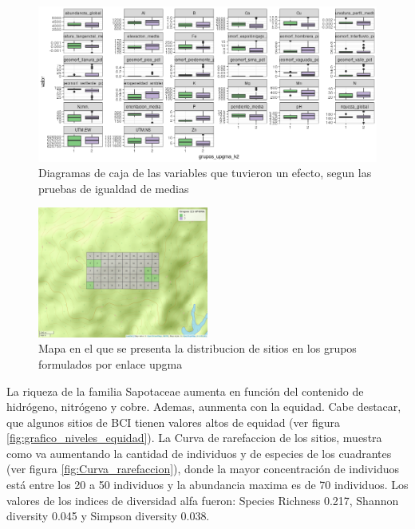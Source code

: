 \documentclass[11pt,]{article}
\begin{document}
\begin{figure}
\centering
\includegraphics[width=1.00000\textwidth]{actualizacion2_grupos_upgma.png}
\caption{Diagramas de caja de las variables que tuvieron un efecto,
segun las pruebas de igualdad de medias\label{fig:grupos_upgma}}
\end{figure}

\begin{figure}
\centering
\includegraphics[width=0.50000\textwidth]{mapa_upgma_k2.png}
\caption{Mapa en el que se presenta la distribucion de sitios en los
grupos formulados por enlace upgma\label{fig:mapa_upgma_k2}}
\end{figure}

La riqueza de la familia Sapotaceae aumenta en función del contenido de
hidrógeno, nitrógeno y cobre. Ademas, aunmenta con la equidad. Cabe
destacar, que algunos sitios de BCI tienen valores altos de equidad (ver
figura \ref{fig:grafico_niveles_equidad}). La Curva de rarefaccion de
los sitios, muestra como va aumentando la cantidad de individuos y de
especies de los cuadrantes (ver figura \ref{fig:Curva_rarefaccion}),
donde la mayor concentración de individuos está entre los 20 a 50
individuos y la abundancia maxima es de 70 individuos. Los valores de
los indices de diversidad alfa fueron: Species Richness 0.217, Shannon
diversity 0.045 y Simpson diversity 0.038.
\end{document}
